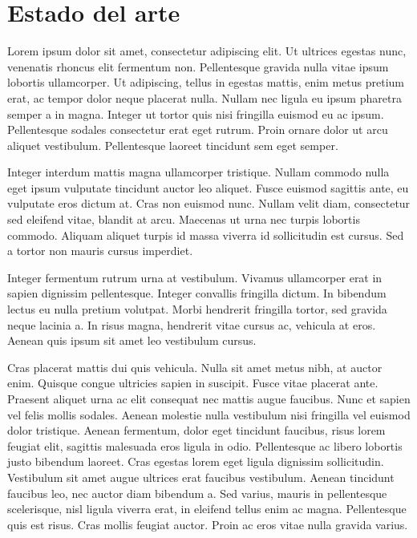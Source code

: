 


\chapter{Estado del arte}
\label{cha:State of the Art}


Lorem ipsum dolor sit amet, consectetur adipiscing elit. Ut ultrices egestas nunc, venenatis rhoncus elit fermentum non. Pellentesque gravida nulla vitae ipsum lobortis ullamcorper. Ut adipiscing, tellus in egestas mattis, enim metus pretium erat, ac tempor dolor neque placerat nulla. Nullam nec ligula eu ipsum pharetra semper a in magna. Integer ut tortor quis nisi fringilla euismod eu ac ipsum. Pellentesque sodales consectetur erat eget rutrum. Proin ornare dolor ut arcu aliquet vestibulum. Pellentesque laoreet tincidunt sem eget semper.

Integer interdum mattis magna ullamcorper tristique. Nullam commodo nulla eget ipsum vulputate tincidunt auctor leo aliquet. Fusce euismod sagittis ante, eu vulputate eros dictum at. Cras non euismod nunc. Nullam velit diam, consectetur sed eleifend vitae, blandit at arcu. Maecenas ut urna nec turpis lobortis commodo. Aliquam aliquet turpis id massa viverra id sollicitudin est cursus. Sed a tortor non mauris cursus imperdiet.

Integer fermentum rutrum urna at vestibulum. Vivamus ullamcorper erat in sapien dignissim pellentesque. Integer convallis fringilla dictum. In bibendum lectus eu nulla pretium volutpat. Morbi hendrerit fringilla tortor, sed gravida neque lacinia a. In risus magna, hendrerit vitae cursus ac, vehicula at eros. Aenean quis ipsum sit amet leo vestibulum cursus.

Cras placerat mattis dui quis vehicula. Nulla sit amet metus nibh, at auctor enim. Quisque congue ultricies sapien in suscipit. Fusce vitae placerat ante. Praesent aliquet urna ac elit consequat nec mattis augue faucibus. Nunc et sapien vel felis mollis sodales. Aenean molestie nulla vestibulum nisi fringilla vel euismod dolor tristique. Aenean fermentum, dolor eget tincidunt faucibus, risus lorem feugiat elit, sagittis malesuada eros ligula in odio. Pellentesque ac libero lobortis justo bibendum laoreet. Cras egestas lorem eget ligula dignissim sollicitudin. Vestibulum sit amet augue ultrices erat faucibus vestibulum. Aenean tincidunt faucibus leo, nec auctor diam bibendum a. Sed varius, mauris in pellentesque scelerisque, nisl ligula viverra erat, in eleifend tellus enim ac magna. Pellentesque quis est risus. Cras mollis feugiat auctor. Proin ac eros vitae nulla gravida varius.

